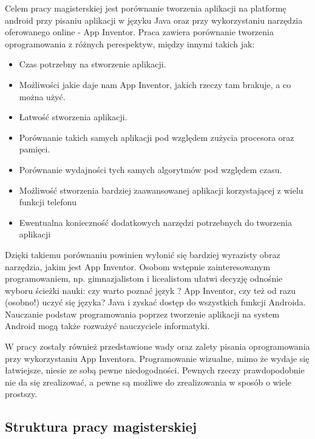 Celem pracy magisterskiej jest porównanie tworzenia aplikacji na platformę android przy pisaniu aplikacji w języku Java oraz przy wykorzystaniu narzędzia oferowanego online - App Inventor. Praca zawiera porównanie tworzenia oprogramowania z różnych perespektyw, między innymi takich jak:
\begin{itemize}
\item Czas potrzebny na stworzenie aplikacji.
\item Możliwości jakie daje nam App Inventor, jakich rzeczy tam brakuje, a co można użyć.
\item Łatwość stworzenia aplikacji.
\item Porównanie takich samych aplikacji pod względem zużycia procesora oraz pamięci.
\item Porównanie wydajności tych samych algorytmów pod względem czasu.
\item Możliwość stworzenia bardziej zaawansowanej aplikacji korzystającej z wielu funkcji telefonu
\item Ewentualna konieczność dodatkowych narzędzi potrzebnych do tworzenia aplikacji
\end{itemize}

Dzięki takiemu porównaniu powinien wyłonić się bardziej wyrazisty obraz narzędzia, jakim jest App Inventor.  Osobom wstępnie zainteresowanym programowaniem, np.  gimnazjalistom i licealistom ułatwi decyzję odnośnie wyboru ścieżki nauki: czy warto poznać język ? App Inventor, czy też od razu (osobno!) uczyć się języka?  Java i zyskać dostęp do wszystkich funkcji Androida. Nauczanie podstaw programowania poprzez tworzenie aplikacji na system Android mogą także  rozważyć nauczyciele informatyki. 


W pracy zostały również przedstawione wady oraz zalety pisania oprogramowania przy wykorzystaniu App Inventora. Programowanie wizualne, mimo że wydaje się łatwiejsze, niesie ze sobą pewne niedogodności. Pewnych rzeczy prawdopodobnie nie da się zrealizować, a pewne są możliwe do zrealizowania w sposób o wiele prostszy. 


\subsection{Struktura pracy magisterskiej}

